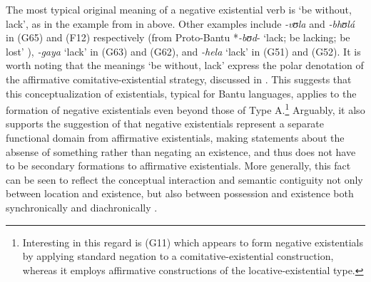 \documentclass[output=paper]{langsci/langscibook}
\begin{document}
The most typical original meaning of a negative existential verb is `be
without, lack', as in the example from  in
 above. Other examples include \textit{-vʊla} and
\textit{-bhʊl{\'a}} in  (G65) and  (F12) respectively
(from Proto-Bantu *\textit{-bʊd}- `lack; be lacking; be lost'
\citep{BastinCoupez2002}), \textit{-gaya} `lack' in  (G63) and
 (G62), and \textit{-hela} `lack' in  (G51) and
 (G52). It is worth noting that the meanings `be without, lack'
express the polar denotation of the affirmative comitative-existential
strategy, discussed in . This suggests that this
conceptualization of existentials, typical for Bantu languages, applies to
the formation of negative existentials even beyond those of Type
A.\footnote{Interesting in this regard is  (G11) which appears to
form negative existentials by applying standard negation to a
comitative-existential construction, whereas it employs affirmative
constructions of the locative-existential type.} 
% 
Arguably, it also supports the suggestion of \citet{Veselinova2013} that
negative existentials represent a separate functional domain from
affirmative existentials, making statements about the absense of something
rather than negating an existence, and thus does not have to be secondary
formations to affirmative existentials. 
%
More generally, this fact can be seen to reflect the conceptual interaction
and semantic contiguity not only between location and existence, but also
between possession and existence both synchronically and diachronically
\parencites(see e.g.)(){Koch1999}{Koch2012}{Heine1997}[see
also][]{Veselinova2013}.
\end{document}
